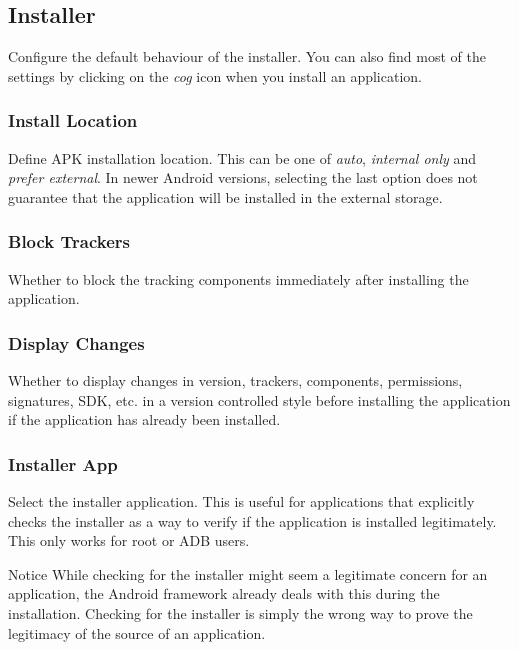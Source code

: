 \subsection{Installer}\label{subsec:installer} %
Configure the default behaviour of the installer. You can also find most of the settings by clicking
on the \textit{cog} icon when you install an application.

\subsubsection{Install Location} %
Define APK installation location. This can be one of \textit{auto}, \textit{internal only} and \textit{prefer external}.
In newer Android versions, selecting the last option does not guarantee that the application will be installed in the
external storage.

\subsubsection{Block Trackers} %
Whether to block the tracking components immediately after installing the application.

\subsubsection{Display Changes} %
Whether to display changes in version, trackers, components, permissions, signatures, SDK, etc. in a version controlled
style before installing the application if the application has already been installed.

\subsubsection{Installer App} %
Select the installer application. This is useful for applications that explicitly checks the installer as a way to
verify if the application is installed legitimately. This only works for root or ADB users.

\begin{tip}{Notice}
    While checking for the installer might seem a legitimate concern for an application, the Android framework already
    deals with this during the installation. Checking for the installer is simply the wrong way to prove the legitimacy
    of the source of an application.
\end{tip}

